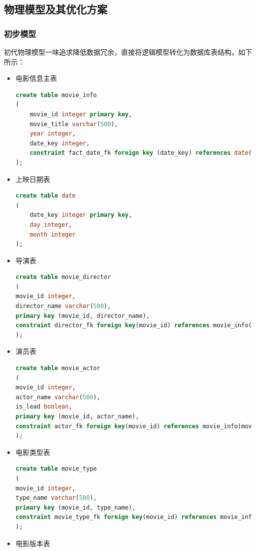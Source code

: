 \documentclass{ctexrep}
\begin{document}
	\subsection{物理模型及其优化方案}
	\subsubsection{初步模型} \label{mysql:1}
	初代物理模型一味追求降低数据冗余，直接将逻辑模型转化为数据库表结构，如下所示：
	\begin{itemize}
	    \item 电影信息主表
	        \begin{lstlisting}[language=sql]
create table movie_info
(
    movie_id integer primary key,
    movie_title varchar(500),
    year integer,
    date_key integer,
    constraint fact_date_fk foreign key (date_key) references date(date_key)
);
	        \end{lstlisting}
	    \item 上映日期表
	        \begin{lstlisting}[language=sql]
create table date
(
    date_key integer primary key,
    day integer,
    month integer
);
            \end{lstlisting}
        \item 导演表
            \begin{lstlisting}[language=sql]
create table movie_director
(
movie_id integer,
director_name varchar(500),
primary key (movie_id, director_name),
constraint director_fk foreign key(movie_id) references movie_info(movie_id)
);
            \end{lstlisting}
        \item 演员表
            \begin{lstlisting}[language=sql]
create table movie_actor
(
movie_id integer,
actor_name varchar(500),
is_lead boolean,
primary key (movie_id, actor_name),
constraint actor_fk foreign key(movie_id) references movie_info(movie_id)
);
            \end{lstlisting}
        \item 电影类型表
            \begin{lstlisting}[language=sql]
create table movie_type
(
movie_id integer,
type_name varchar(500),
primary key (movie_id, type_name),
constraint movie_type_fk foreign key(movie_id) references movie_info(movie_id)
);
            \end{lstlisting}
        \item 电影版本表
            \begin{lstlisting}[language=sql]

\end{lstlisting}
\end{itemize}
\end{document}
